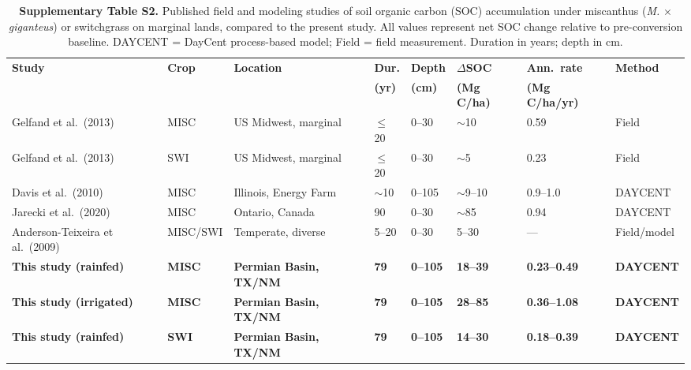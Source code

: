 \documentclass[11pt]{article}
\begin{document}
\begin{table}[h!]
\centering
\caption*{\textbf{Supplementary Table S2.} Published field and modeling studies of soil organic carbon (SOC) accumulation under miscanthus (\textit{M.} $\times$ \textit{giganteus}) or switchgrass on marginal lands, compared to the present study. All values represent net SOC change relative to pre-conversion baseline. DAYCENT = DayCent process-based model; Field = field measurement. Duration in years; depth in cm.}
\begin{tabular}{p{2.8cm}p{1.5cm}p{1.8cm}p{1.0cm}p{1.2cm}p{1.5cm}p{1.5cm}p{1.8cm}}
\hline
\textbf{Study} & \textbf{Crop} & \textbf{Location} & \textbf{Dur.} & \textbf{Depth} & \textbf{$\Delta$SOC} & \textbf{Ann.\ rate} & \textbf{Method} \\
 & & & \textbf{(yr)} & \textbf{(cm)} & \textbf{(Mg C/ha)} & \textbf{(Mg C/ha/yr)} & \\
\hline
Gelfand et al.\ (2013) & MISC & US Midwest, marginal & $\leq$20 & 0--30 & $\sim$10 & 0.59 & Field \\
Gelfand et al.\ (2013) & SWI & US Midwest, marginal & $\leq$20 & 0--30 & $\sim$5 & 0.23 & Field \\
Davis et al.\ (2010) & MISC & Illinois, Energy Farm & $\sim$10 & 0--105 & $\sim$9--10 & 0.9--1.0 & DAYCENT \\
Jarecki et al.\ (2020) & MISC & Ontario, Canada & 90 & 0--30 & $\sim$85 & 0.94 & DAYCENT \\
Anderson-Teixeira et al.\ (2009) & MISC/SWI & Temperate, diverse & 5--20 & 0--30 & 5--30 & — & Field/model \\
\textbf{This study (rainfed)} & \textbf{MISC} & \textbf{Permian Basin, TX/NM} & \textbf{79} & \textbf{0--105} & \textbf{18--39} & \textbf{0.23--0.49} & \textbf{DAYCENT} \\
\textbf{This study (irrigated)} & \textbf{MISC} & \textbf{Permian Basin, TX/NM} & \textbf{79} & \textbf{0--105} & \textbf{28--85} & \textbf{0.36--1.08} & \textbf{DAYCENT} \\
\textbf{This study (rainfed)} & \textbf{SWI} & \textbf{Permian Basin, TX/NM} & \textbf{79} & \textbf{0--105} & \textbf{14--30} & \textbf{0.18--0.39} & \textbf{DAYCENT} \\
\hline
\end{tabular}
\end{table}
\end{document}
